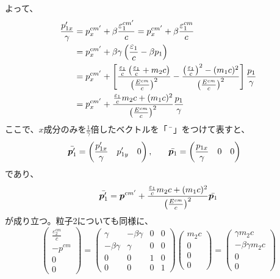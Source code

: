 \documentclass[a4paper,11pt,dvipdfmx]{jsarticle}
\begin{document}
よって、
\begin{align}
    \frac{p'_{1x}}{\gamma} &= p^{cm'}_{x}+ \beta\frac{\varepsilon^{cm'}_{1}}{c} = p^{cm'}_{x}+ \beta\frac{\varepsilon^{cm}_{1}}{c} \notag\\
    &= p^{cm'}_{x} + \beta\gamma\left(\frac{\varepsilon_{1}}{c}-\beta p_{1}\right) \notag\\
    &= p^{cm'}_{x} + \left[\frac{\frac{\varepsilon_{1}}{c}\left(\frac{\varepsilon_{1}}{c}+m_{2}c\right)}{\left(\frac{E^{cm}}{c}\right)^2}-\frac{\left(\frac{\varepsilon_{1}}{c}\right)^2-(m_{1}c)^2}{\left(\frac{E^{cm}}{c}\right)^2}\right]\frac{p_{1}}{\gamma} \notag\\
    &=  p^{cm'}_{x} +\frac{\frac{\varepsilon_{1}}{c}m_{2}c+(m_{1}c)^2}{\left(\frac{E^{cm}}{c}\right)^2}\frac{p_{1}}{\gamma} 
\end{align}
ここで、$x$成分のみを$\tfrac{1}{\gamma}$倍したベクトルを「$\;\Bar{}\;$」をつけて表すと、
\begin{alignat*}{2}
    \Bar{\bm{p}'_{1}} &= \left(\frac{p'_{1x}}{\gamma} \quad p'_{1y} \quad 0\right), &\quad  \Bar{\bm{p}_{1}} &= \left(\frac{p_{1x}}{\gamma} \quad 0 \quad 0\right) 
\end{alignat*}
であり、
\begin{equation}
     \Bar{\bm{p}'_{1}} = \bm{p}^{cm'} +\frac{\frac{\varepsilon_{1}}{c}m_{2}c+(m_{1}c)^2}{\left(\frac{E^{cm}}{c}\right)^2}\Bar{\bm{p}_{1}}\label{eq:p1}
\end{equation}
が成り立つ。粒子2についても同様に、
\begin{equation}
    \left(
    \begin{array}{c}
     \frac{\varepsilon^{cm}_{2}}{c}  \\
      -p^{cm}\\
      0 \\
      0
    \end{array}
  \right)  = \left(
    \begin{array}{cccc}
      \gamma & -\beta\gamma & 0 & 0 \\
      -\beta\gamma & \gamma & 0 & 0 \\
      0 & 0 & 1 & 0 \\
      0 & 0 & 0 & 1
    \end{array}
    \right) 
      \left(
    \begin{array}{c}
     m_{2}c\\
      0\\
      0\\
      0
    \end{array}
  \right) =
    \left(
    \begin{array}{c}
     \gamma m_{2}c\\
      -\beta\gamma m_{2}c\\
      0\\
      0
    \end{array}
  \right) 
\end{equation}
\end{document}
